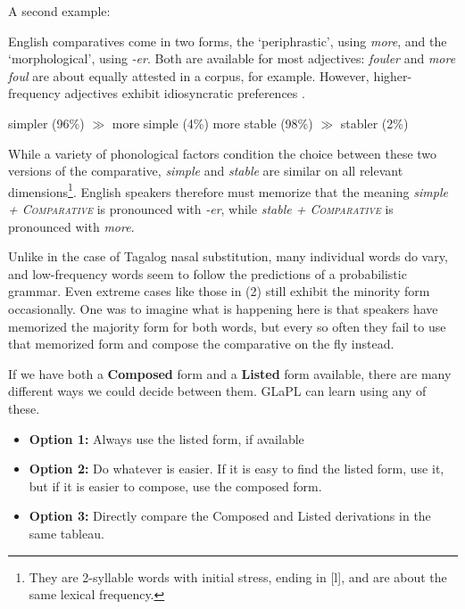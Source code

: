 \documentclass[12]{article}
\begin{document}
		\hspace{2ex}
		
		A second example: 
		
		English comparatives come in two forms, the `periphrastic', using {\it more}, and the `morphological', using {\it -er}.  Both are available for most adjectives: {\it fouler} and {\it more foul} are about equally attested in a corpus, for example.  However, higher-frequency adjectives exhibit idiosyncratic preferences \citet{smithmoorecantwell17}.
		
		\begin{exe}
			\ex \begin{xlist}
				\ex simpler (96\%) $\gg$ more simple (4\%)
				\ex more stable (98\%) $\gg$ stabler (2\%)
			\end{xlist}
		\end{exe}
		
		While a variety of phonological factors condition the choice between these two versions of the comparative, {\it simple} and {\it stable} are similar on all relevant dimensions\footnote{They are 2-syllable words with initial stress, ending in [l], and are about the same lexical frequency.}.  English speakers therefore must memorize that the meaning {\it simple + \textsc{Comparative}} is pronounced with {\it -er}, while {\it stable + \textsc{Comparative}} is pronounced with {\it more}.
		
		Unlike in the case of Tagalog nasal substitution, many individual words do vary, and low-frequency words seem to follow the predictions of a probabilistic grammar.  Even extreme cases like those in (2) still exhibit the minority form occasionally.  One was to imagine what is happening here is that speakers have memorized the majority form for both words, but every so often they fail to use that memorized form and compose the comparative on the fly instead.
		
		\hspace{2ex}
		
		
		If we have both a {\bf Composed} form and a {\bf Listed} form available, there are many different ways we could decide between them.  GLaPL can learn using any of these.
		
		\begin{itemize}
			\item[] {\bf Option 1:} Always use the listed form, if available
			\item[] {\bf Option 2:} Do whatever is easier.  If it is easy to find the listed form, use it, but if it is easier to compose, use the composed form.
			\item[] {\bf Option 3:} Directly compare the Composed and Listed derivations in the same tableau.
		\end{itemize}
\end{document}
